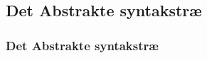 \subsection{Det Abstrakte syntakstræ}
\begin{frame}
  \frametitle{Det Abstrakte syntakstræ}


\end{frame}
